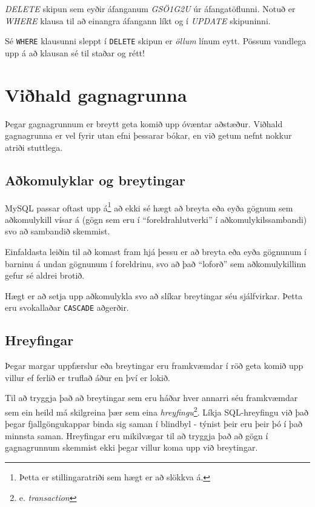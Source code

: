 \begin{example}
\caption[DELETE]{\emph{DELETE} skipun sem eyðir áfanganum \emph{GSÖ1G2U} úr áfangatöflunni. Notuð er \emph{WHERE} klausa til að einangra áfangann líkt og í \emph{UPDATE} skipuninni.}
\label{sql:k7d4-delete}
\centering
{}
\end{example}

Sé \verb|WHERE| klausunni sleppt í \verb|DELETE| skipun er \emph{öllum} línum eytt. Pössum vandlega upp á að klausan sé til staðar og rétt!
\section{Viðhald gagnagrunna}
Þegar gagnagrunnum er breytt geta komið upp óvæntar aðstæður. Viðhald gagnagrunna er vel fyrir utan efni þessarar bókar, en við getum nefnt nokkur atriði stuttlega.
\subsection{Aðkomulyklar og breytingar}
MySQL passar oftast upp á\footnote{Þetta er stillingaratriði sem hægt er að slökkva á.} að ekki sé hægt að breyta eða eyða gögnum sem aðkomulykill vísar á (gögn sem eru í ``foreldrahlutverki'' í aðkomulykilssambandi) svo að sambandið skemmist.

Einfaldasta leiðin til að komast fram hjá þessu er að breyta eða eyða gögnunum í barninu á undan gögnunum í foreldrinu, svo að það ``loforð'' sem aðkomulykillinn gefur sé aldrei brotið.

Hægt er að setja upp aðkomulykla svo að slíkar breytingar séu sjálfvirkar. Þetta eru svokallaðar \verb|CASCADE| aðgerðir.
\subsection{Hreyfingar} %
Þegar margar uppfærslur eða breytingar eru framkvæmdar í röð geta komið upp villur ef ferlið er truflað áður en því er lokið.

Til að tryggja það að breytingar sem eru háðar hver annarri séu framkvæmdar sem ein heild má skilgreina þær sem eina \emph{hreyfingu}\footnote{e. \emph{transaction}}. Líkja SQL-hreyfingu við það þegar fjallgöngukappar binda sig saman í blindbyl - týnist þeir eru þeir þó í það minnsta saman. Hreyfingar eru mikilvægar til að tryggja það að gögn í gagnagrunnum skemmist ekki þegar villur koma upp við breytingar.